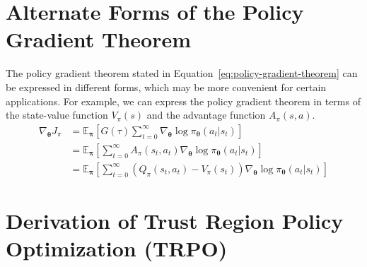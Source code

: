 \documentclass[12pt]{report}
\theoremstyle{definition}
\theoremstyle{remark}
\begin{document}
\begin{appendices}
\section{Alternate Forms of the Policy Gradient Theorem}
The policy gradient theorem stated in Equation~\ref{eq:policy-gradient-theorem} can be expressed in different forms, which may be more convenient for certain applications. For example, we can express the policy gradient theorem in terms of the state-value function $V_\pi(s)$ and the advantage function $A_\pi(s, a)$.
\begin{align}
    \nabla_{\boldsymbol{\theta}} J_\pi &= \mathbb{E}_{\boldsymbol{\pi}}\left[G(\tau) \sum_{t=0}^{\infty} \nabla_{\boldsymbol{\theta}} \log \pi_{\boldsymbol{\theta}}(a_t | s_t)\right] \\
    &= \mathbb{E}_{\boldsymbol{\pi}}\left[\sum_{t=0}^{\infty} A_\pi(s_t, a_t) \nabla_{\boldsymbol{\theta}} \log \pi_{\boldsymbol{\theta}}(a_t | s_t)\right] \tag{using $A_\pi(s, a) = G(\tau) - V_\pi(s)$} \\
    &= \mathbb{E}_{\boldsymbol{\pi}}\left[\sum_{t=0}^{\infty} (Q_\pi(s_t, a_t) - V_\pi(s_t)) \nabla_{\boldsymbol{\theta}} \log \pi_{\boldsymbol{\theta}}(a_t | s_t)\right] \tag{using $A_\pi(s, a) = Q_\pi(s, a) - V_\pi(s)$}
\end{align}



\section{Derivation of Trust Region Policy Optimization (TRPO)}
\label{sec:trpo-derivation}
\end{appendices}


\nocite{*} %

\printglossaries

\printbibliography
{}
\end{document}
